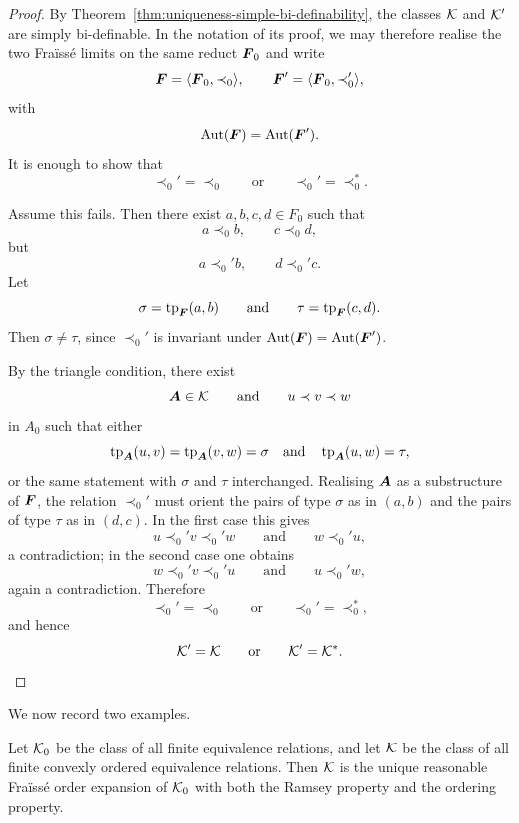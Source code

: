 \begin{proof}
    By Theorem~\ref{thm:uniqueness-simple-bi-definability}, the classes \(\mathcal{K}\)
    and \(\mathcal{K}'\) are simply bi-definable. In the notation of its proof, we may
    therefore realise the two Fraïssé limits on the same reduct \(\boldsymbol{F}_0\)
    and write
    \[
        \boldsymbol{F}=\langle \boldsymbol{F}_0,\prec_0\rangle,
        \qquad
        \boldsymbol{F}'=\langle \boldsymbol{F}_0,\prec_0'\rangle,
    \]
    with
    \[
        \operatorname{Aut}(\boldsymbol{F})=\operatorname{Aut}(\boldsymbol{F}').
    \]
    It is enough to show that
    \[
        \prec_0'=\prec_0
        \qquad\text{or}\qquad
        \prec_0'=\prec_0^*.
    \]

    Assume this fails. Then there exist \(a,b,c,d\in F_0\)
    such that
    \[
        a\prec_0 b,\qquad c\prec_0 d,
    \]
    but
    \[
        a\prec_0' b,\qquad d\prec_0' c.
    \]
    Let
    \[
        \sigma=\operatorname{tp}_{\boldsymbol{F}}(a,b)
        \qquad\text{and}\qquad
        \tau=\operatorname{tp}_{\boldsymbol{F}}(c,d).
    \]
    Then \(\sigma\neq \tau\),
    since \(\prec_0'\) is invariant under \(\operatorname{Aut}(\boldsymbol{F})=\operatorname{Aut}(\boldsymbol{F}')\).

    By the triangle condition, there exist
    \[
        \boldsymbol{A}\in\mathcal{K}
        \qquad\text{and}\qquad
        u\prec v\prec w
    \]
    in \(A_0\) such that either
    \[
        \operatorname{tp}_{\boldsymbol{A}}(u,v)=\operatorname{tp}_{\boldsymbol{A}}(v,w)=\sigma
        \quad\text{and}\quad
        \operatorname{tp}_{\boldsymbol{A}}(u,w)=\tau,
    \]
    or the same statement with \(\sigma\) and \(\tau\) interchanged. Realising \(\boldsymbol{A}\) as a substructure of \(\boldsymbol{F}\), the relation \(\prec_0'\) must orient the pairs of type \(\sigma\) as in \((a,b)\) and the pairs of type \(\tau\) as in \((d,c)\). In the first case this gives
    \[
        u\prec_0' v\prec_0' w
        \qquad\text{and}\qquad
        w\prec_0' u,
    \]
    a contradiction; in the second case one obtains
    \[
        w\prec_0' v\prec_0' u
        \qquad\text{and}\qquad
        u\prec_0' w,
    \]
    again a contradiction. Therefore
    \[
        \prec_0'=\prec_0
        \qquad\text{or}\qquad
        \prec_0'=\prec_0^*,
    \]
    and hence
    \[
        \mathcal{K}'=\mathcal{K}
        \qquad\text{or}\qquad
        \mathcal{K}'=\mathcal{K}^*.
    \]
\end{proof}

We now record two examples.

\begin{example}
    Let \(\mathcal{K}_0\) be the class of all finite equivalence relations, and let \(\mathcal{K}\) be the class of all finite convexly ordered equivalence relations. Then \(\mathcal{K}\) is the unique reasonable Fraïssé order expansion of \(\mathcal{K}_0\) with both the Ramsey property and the ordering property.
\end{example}

